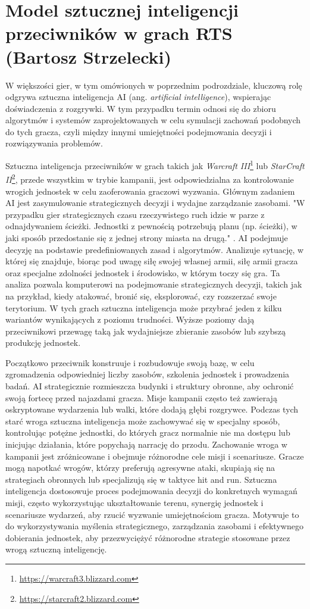 \section{Model sztucznej inteligencji przeciwników w grach RTS (Bartosz Strzelecki)}\label{s:ai_wpr}
W większości gier, w tym omówionych w poprzednim podrozdziale, kluczową rolę odgrywa sztuczna inteligencja AI (ang.  \textit{artificial intelligence}), wspierając doświadczenia z rozgrywki.
W tym przypadku termin odnosi się do zbioru algorytmów i systemów zaprojektowanych w celu symulacji
zachowań podobnych do tych gracza, czyli między innymi umiejętności podejmowania decyzji i rozwiązywania problemów.

Sztuczna inteligencja przeciwników w grach takich jak \textit{Warcraft III}\footnote{\url{https://warcraft3.blizzard.com}} lub \textit{StarCraft II}\footnote{\url{https://starcraft2.blizzard.com}}, przede wszystkim w trybie kampanii,
jest odpowiedzialna za kontrolowanie wrogich jednostek w celu zaoferowania graczowi wyzwania. Głównym zadaniem AI jest zasymulowanie
strategicznych decyzji i wydajne zarządzanie zasobami.
"W przypadku gier strategicznych czasu rzeczywistego ruch idzie w parze z odnajdywaniem ścieżki. Jednostki z pewnością potrzebują planu (np. ścieżki), 
w jaki sposób przedostanie się z jednej strony miasta na drugą." \cite{units}.
AI podejmuje decyzję na podstawie predefiniowanych zasad i algorytmów. Analizuje sytuację, w której się znajduje, biorąc pod uwagę
siłę swojej własnej armii, siłę armii gracza oraz specjalne zdolności jednostek i środowisko, w którym toczy się gra.
Ta analiza pozwala komputerowi na podejmowanie strategicznych decyzji, takich jak na przykład, kiedy atakować, bronić się, eksplorować, czy rozszerzać swoje terytorium.
W tych grach sztuczna inteligencja może przybrać jeden z kilku wariantów wynikających z poziomu trudności. Wyższe poziomy
dają przeciwnikowi przewagę taką jak wydajniejsze zbieranie zasobów lub szybszą produkcję jednostek.

Początkowo przeciwnik konstruuje i rozbudowuje swoją bazę, w celu zgromadzenia odpowiedniej liczby zasobów, szkolenia jednostek i prowadzenia badań.
AI strategicznie rozmieszcza budynki i struktury obronne, aby ochronić swoją fortecę przed najazdami gracza. 
Misje kampanii często też zawierają oskryptowane wydarzenia lub walki, które dodają głębi rozgrywce. Podczas tych starć wroga sztuczna inteligencja
może zachowywać się w specjalny sposób, kontrolując potężne jednostki, do których gracz normalnie nie ma dostępu lub inicjując działania, które popychają
narrację do przodu.
Zachowanie wroga w kampanii jest zróżnicowane i obejmuje różnorodne cele misji i scenariusze. Gracze mogą napotkać wrogów, którzy preferują agresywne ataki,
skupiają się na strategiach obronnych lub specjalizują się w taktyce hit and run. Sztuczna inteligencja dostosowuje proces podejmowania decyzji do
konkretnych wymagań misji, często wykorzystując ukształtowanie terenu, synergię jednostek i scenariusze wydarzeń, aby rzucić wyzwanie umiejętnościom gracza.
Motywuje to do wykorzystywania myślenia strategicznego, zarządzania zasobami i efektywnego dobierania jednostek, aby przezwyciężyć różnorodne strategie stosowane przez wrogą sztuczną inteligencję.

